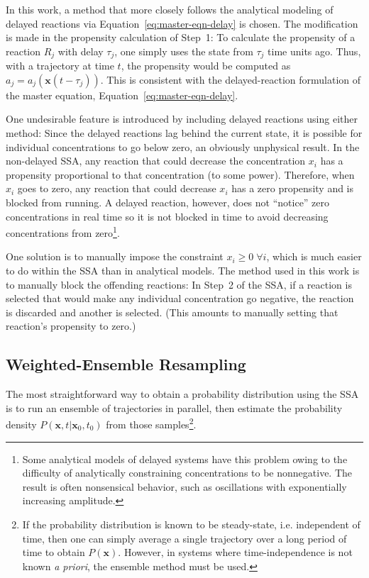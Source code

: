 \documentclass[english,letterpaper,12pt]{article}
\renewcommand{\vec}[1]{\ensuremath{\mathbf{#1}}}
\newcommand{\delaytime}{\ensuremath{\tau}}
\begin{document}
\begin{doublespacing}
In this work, a method that more closely follows the analytical modeling of delayed reactions via Equation~\eqref{eq:master-eqn-delay} is chosen. The modification is made in the propensity calculation of Step~1: To calculate the propensity of a reaction $R_j$ with delay $\delaytime_j$, one simply uses the state from $\delaytime_j$ time units ago. Thus, with a trajectory at time $t$, the propensity would be computed as $a_j = a_j\left(\vec{x}(t - \delaytime_j)\right)$. This is consistent with the delayed-reaction formulation of the master equation, Equation~\eqref{eq:master-eqn-delay}.

One undesirable feature is introduced by including delayed reactions using either method: Since the delayed reactions lag behind the current state, it is possible for individual concentrations to go below zero, an obviously unphysical result. In the non-delayed SSA, any reaction that could decrease the concentration $x_i$ has a propensity proportional to that concentration (to some power). Therefore, when $x_i$ goes to zero, any reaction that could decrease $x_i$ has a zero propensity and is blocked from running. A delayed reaction, however, does not ``notice'' zero concentrations in real time so it is not blocked in time to avoid decreasing concentrations from zero\footnote{Some analytical models of delayed systems have this problem owing to the difficulty of analytically constraining concentrations to be nonnegative. The result is often nonsensical behavior, such as oscillations with exponentially increasing amplitude.}.

One solution is to manually impose the constraint $x_i \geq 0\; \forall i$, which is much easier to do within the SSA than in analytical models. The method used in this work is to manually block the offending reactions: In Step~2 of the SSA, if a reaction is selected that would make any individual concentration go negative, the reaction is discarded and another is selected. (This amounts to manually setting that reaction's propensity to zero.) 


\subsection{Weighted-Ensemble Resampling} %
\label{sub:we-resampling-intro}

The most straightforward way to obtain a probability distribution using the SSA is to run an ensemble of trajectories in parallel, then estimate the probability density $P(\vec{x}, t | \vec{x}_0, t_0)$ from those samples\footnote{If the probability distribution is known to be steady-state, i.e. independent of time, then one can simply average a single trajectory over a long period of time to obtain $P(\vec{x})$. However, in systems where time-independence is not known \textit{a priori}, the ensemble method must be used.}.


\end{doublespacing}
\end{document}
